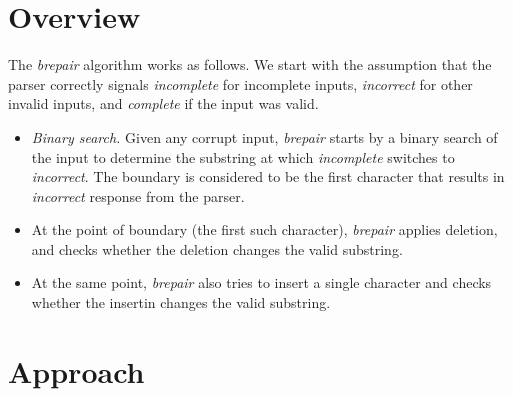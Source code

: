 \documentclass[sigconf,review,anonymous]{acmart}
\makeatletter
\newcommand{\approach}{\textsc{BRepair}\xspace}
\newcommand{\ddmax}{\textit{DDMax}\xspace}
\newcommand{\brepair}{\textit{brepair}\xspace}
\newcommand\letterboxed[1]{%
\setlength{\fboxsep}{0pt}%
  \@tfor\@ii:=#1\do{%
    \fcolorbox{white}{light-gray}{\texttt{\strut\@ii}}%
  }%
}
\makeatother
\begin{document}
\section{Overview}
The \brepair algorithm works as follows.
We start with the assumption that the parser correctly signals
\emph{incomplete} for incomplete inputs, \emph{incorrect} for other invalid
inputs, and \emph{complete} if the input was valid.
\begin{itemize}
\item \emph{Binary search.} Given any corrupt input, \brepair starts by a
binary search of the input to determine the substring at which \emph{incomplete}
switches to \emph{incorrect}. The boundary is considered to be the first
character that results in \emph{incorrect} response from the parser.

\item At the point of boundary (the first such character), \brepair applies
deletion, and checks whether the deletion changes the valid substring.

\item At the same point, \brepair also tries to insert a single character and
checks whether the insertin changes the valid substring.

\end{itemize}


\section{Approach}

%
\end{document}
